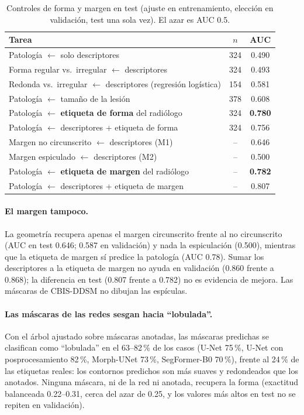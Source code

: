 \documentclass[11pt,a4paper]{article}
\begin{document}
\begin{table}[H]
\centering\small
\caption{Controles de forma y margen en test (ajuste en entrenamiento, elección en validación, test una sola vez). El azar es AUC 0.5.}
\label{tab:ctrl}
\begin{tabular}{lcc}
\toprule
Tarea & $n$ & AUC \\
\midrule
Patología $\leftarrow$ solo descriptores & 324 & 0.490 \\
Forma regular vs.\ irregular $\leftarrow$ descriptores & 324 & 0.493 \\
Redonda vs.\ irregular $\leftarrow$ descriptores (regresión logística) & 154 & 0.581 \\
Patología $\leftarrow$ tamaño de la lesión & 378 & 0.608 \\
Patología $\leftarrow$ \textbf{etiqueta de forma} del radiólogo & 324 & \textbf{0.780} \\
Patología $\leftarrow$ descriptores + etiqueta de forma & 324 & 0.756 \\
Margen no circunscrito $\leftarrow$ descriptores (M1) & -- & 0.646 \\
Margen espiculado $\leftarrow$ descriptores (M2) & -- & 0.500 \\
Patología $\leftarrow$ \textbf{etiqueta de margen} del radiólogo & -- & \textbf{0.782} \\
Patología $\leftarrow$ descriptores + etiqueta de margen & -- & 0.807 \\
\bottomrule
\end{tabular}
\end{table}

\paragraph{El margen tampoco.} La geometría recupera apenas el margen circunscrito frente al no circunscrito (AUC en test 0.646; 0.587 en validación) y nada la espiculación (0.500), mientras que la etiqueta de margen sí predice la patología (AUC 0.78). Sumar los descriptores a la etiqueta de margen no ayuda en validación (0.860 frente a 0.868); la diferencia en test (0.807 frente a 0.782) no es evidencia de mejora. Las máscaras de CBIS-DDSM no dibujan las espículas.

\paragraph{Las máscaras de las redes sesgan hacia ``lobulada''.} Con el árbol ajustado sobre máscaras anotadas, las máscaras predichas se clasifican como ``lobulada'' en el 63--82\,\% de los casos (U-Net 75\,\%, U-Net con posprocesamiento 82\,\%, Morph-UNet 73\,\%, SegFormer-B0 70\,\%), frente al 24\,\% de las etiquetas reales: los contornos predichos son más suaves y redondeados que los anotados. Ninguna máscara, ni de la red ni anotada, recupera la forma (exactitud balanceada 0.22--0.31, cerca del azar de 0.25, y los valores más altos en test no se repiten en validación).
\end{document}
